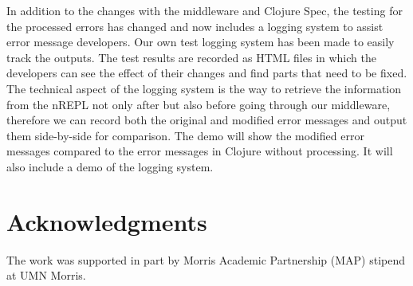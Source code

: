 \documentclass[12pt]{article}
\begin{document}
In addition to the changes with the middleware and Clojure Spec, the testing for the processed errors has changed and now includes a logging system to assist error message developers. Our own test logging system has been made to easily track the outputs. The test results are recorded as HTML files in which the developers can see the effect of their changes and find parts that need to be fixed. The technical aspect of the logging system is the way to retrieve the information from the nREPL not only after but also before going through our middleware, therefore we can record both the original and modified error messages and output them side-by-side for comparison.
The demo will show the modified error messages compared to the error messages in Clojure without processing. It will also include a demo of the logging system.


\section{Acknowledgments}
The work was supported in part by Morris Academic Partnership (MAP) stipend at UMN Morris.



\end{document}
